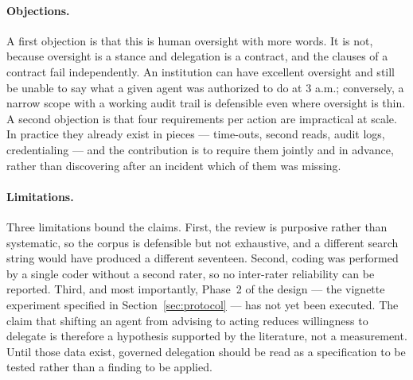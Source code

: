 \paragraph{Objections.}
A first objection is that this is human oversight with more words. It is not, because oversight is a stance and delegation is a contract, and the clauses of a contract fail independently. An institution can have excellent oversight and still be unable to say what a given agent was authorized to do at 3 a.m.; conversely, a narrow scope with a working audit trail is defensible even where oversight is thin. A second objection is that four requirements per action are impractical at scale. In practice they already exist in pieces --- time-outs, second reads, audit logs, credentialing --- and the contribution is to require them jointly and in advance, rather than discovering after an incident which of them was missing.

\paragraph{Limitations.}
Three limitations bound the claims. First, the review is purposive rather than systematic, so the corpus is defensible but not exhaustive, and a different search string would have produced a different seventeen. Second, coding was performed by a single coder without a second rater, so no inter-rater reliability can be reported. Third, and most importantly, Phase~2 of the design --- the vignette experiment specified in Section~\ref{sec:protocol} --- has not yet been executed. The claim that shifting an agent from advising to acting reduces willingness to delegate is therefore a hypothesis supported by the literature, not a measurement. Until those data exist, governed delegation should be read as a specification to be tested rather than a finding to be applied.

